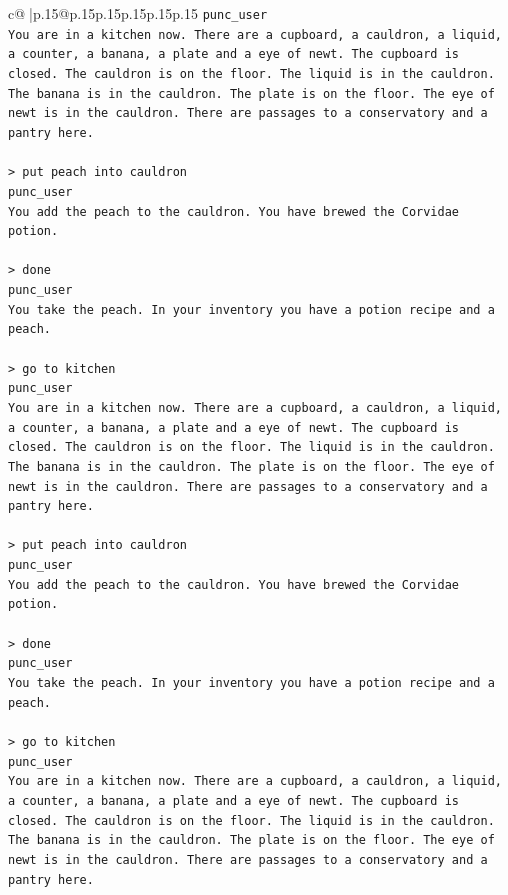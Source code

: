 \documentclass{article}
\begin{document}
{\begin{supertabular}{c@{$\;$}|p{.15\linewidth}@{}p{.15\linewidth}p{.15\linewidth}p{.15\linewidth}p{.15\linewidth}p{.15\linewidth}}
{{{\texttt{punc\_user} \\
\texttt{You are in a kitchen now. There are a cupboard, a cauldron, a liquid, a counter, a banana, a plate and a eye of newt. The cupboard is closed. The cauldron is on the floor. The liquid is in the cauldron. The banana is in the cauldron. The plate is on the floor. The eye of newt is in the cauldron. There are passages to a conservatory and a pantry here.} \\
\\ 
\texttt{> put peach into cauldron} \\
\texttt{punc\_user} \\
\texttt{You add the peach to the cauldron. You have brewed the Corvidae potion.} \\
\\ 
\texttt{> done } \\
\texttt{punc\_user} \\
\texttt{You take the peach. In your inventory you have a potion recipe and a peach.} \\
\\ 
\texttt{> go to kitchen} \\
\texttt{punc\_user} \\
\texttt{You are in a kitchen now. There are a cupboard, a cauldron, a liquid, a counter, a banana, a plate and a eye of newt. The cupboard is closed. The cauldron is on the floor. The liquid is in the cauldron. The banana is in the cauldron. The plate is on the floor. The eye of newt is in the cauldron. There are passages to a conservatory and a pantry here.} \\
\\ 
\texttt{> put peach into cauldron} \\
\texttt{punc\_user} \\
\texttt{You add the peach to the cauldron. You have brewed the Corvidae potion.} \\
\\ 
\texttt{> done } \\
\texttt{punc\_user} \\
\texttt{You take the peach. In your inventory you have a potion recipe and a peach.} \\
\\ 
\texttt{> go to kitchen} \\
\texttt{punc\_user} \\
\texttt{You are in a kitchen now. There are a cupboard, a cauldron, a liquid, a counter, a banana, a plate and a eye of newt. The cupboard is closed. The cauldron is on the floor. The liquid is in the cauldron. The banana is in the cauldron. The plate is on the floor. The eye of newt is in the cauldron. There are passages to a conservatory and a pantry here.} \\
}}}
\end{supertabular}}
\end{document}
